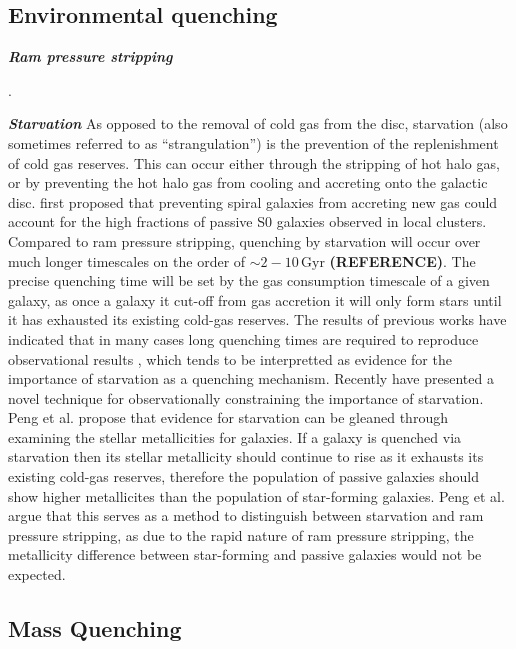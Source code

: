 \subsection{Environmental quenching}
\label{sec:enviro_quench}

\noindent \textit{\textbf{Ram pressure stripping}}
\smallskip
\newline

\citep{kenney2004, chung2007,
  chung2009, kenney2015}. \newline

\noindent \textit{\textbf{Starvation}}
\smallskip
\newline
As opposed to the removal of cold gas from the disc, starvation (also
sometimes referred to as ``strangulation'') is the prevention of the
replenishment of cold gas reserves.  This can occur either through the
stripping of hot halo gas, or by preventing the hot halo gas from
cooling and accreting onto the galactic disc.  \citet{larson1980}
first proposed that preventing spiral galaxies from accreting new gas
could account for the high fractions of passive S0 galaxies observed
in local clusters.  Compared to ram pressure stripping, quenching by
starvation will occur over much longer timescales on the order of
$\sim 2 - 
10\,\mathrm{Gyr}$ \textbf{(REFERENCE)}.  The precise quenching time
will be set by the gas consumption timescale of a given galaxy, as
once a galaxy it cut-off from gas accretion it will only form stars
until it has exhausted its existing cold-gas reserves.  The results of
previous works have indicated that in many cases long quenching times
are required to reproduce observational results \citep{balogh2000,
  balogh2000b, wetzel2013, wheeler2014}, which tends to be interpretted as
evidence for the importance of starvation as a quenching mechanism.
Recently \citet{peng2015} have presented a novel technique for
observationally constraining the importance of starvation.  Peng et
al. propose that evidence for starvation can be gleaned through
examining the stellar metallicities for galaxies.  If a galaxy is
quenched via starvation then its stellar metallicity should continue
to rise as it exhausts its existing cold-gas reserves, therefore the
population of passive galaxies should show higher metallicites than
the population of star-forming galaxies.  Peng et al. argue that this
serves as a method to distinguish between starvation and ram pressure
stripping, as due to the rapid nature of ram pressure stripping, the
metallicity difference between star-forming and passive galaxies would
not be expected.  

\subsection{Mass Quenching}
\label{mass_quench}

%


